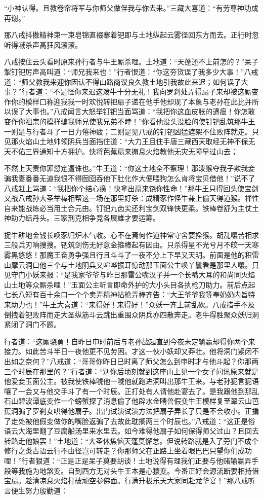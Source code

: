 \documentclass[12pt,UTF8]{ctexbook}
\begin{document}
“小神认得。且教卷帘将军与你师父做伴我与你去来。”三藏大喜道：“有劳尊神功成再谢。”

那八戒抖擞精神束一束皂锦直裰搴着钯即与土地纵起云雾径回东方而去。正行时忽听得喊杀声高狂风滚滚。

八戒按住云头看时原来孙行者与牛王厮杀哩。土地道：“天蓬还不上前怎的？”呆子掣钉钯厉声高叫道：“师兄我来也！”行者恨道：“你这夯货误了我多少大事！”八戒道：“师父教我来迎你因认不得山路商议良久教土地引我故此来迟；如何误了大事？”行者道：“不是怪你来迟这泼牛十分无礼！我向罗刹处弄得扇子来却被这厮变作你的模样口称迎我我一时欢悦转把扇子递在他手他却现了本象与老孙在此比并所以误了大事也。”八戒闻言大怒举钉钯当面骂道：“我把你这血皮胀的遭瘟！你怎敢变作你祖宗的模样骗我师兄使我兄弟不睦！”你看他没头没脸的使钉钯乱筑那牛王一则是与行者斗了一日力倦神疲；二则是见八戒的钉钯凶猛遮架不住败阵就走。只见那火焰山土地帅领阴兵当面挡住道：“大力王且住手唐三藏西天取经无神不保无天不佑三界通知十方拥护。快将芭蕉扇来搧息火焰教他无灾无障早过山去；

不然上天责你罪愆定遭诛也。”牛王道：“你这土地全不察理！那泼猴夺我子欺我妾骗我妻番番无道我恨不得囫囵吞他下肚化作大便喂狗怎么肯将宝贝借他！”说不了八戒赶上骂道：“我把你个结心癀！快拿出扇来饶你性命！”那牛王只得回头使宝剑又战八戒孙大圣举棒相帮这一场在那里好杀：成精豕作怪牛兼上偷天得道猴。禅性自来能战炼必当用土合元由。钉钯九齿尖还利宝剑双锋快更柔。铁棒卷舒为主仗土神助力结丹头。三家刑克相争竞各展雄才要运筹。

捉牛耕地金钱长唤豕归炉木气收。心不在焉何作道神常守舍要拴猴。胡乱嚷苦相求三般兵刃响搜搜。钯筑剑伤无好意金箍棒起有因由。只杀得星不光兮月不皎一天寒雾黑悠悠！那魔王奋勇争强且行且斗斗了一夜不分上下早又天明。前面是他的积雷山摩云洞口他三个与土地阴兵又喧哗振耳惊动那玉面公主唤丫鬟看是那里人嚷。只见守门小妖来报：“是我家爷爷与昨日那雷公嘴汉子并一个长嘴大耳的和尚同火焰山土地等众厮杀哩！”玉面公主听言即命外护的大小头目各执枪刀助力。前后点起七长八短有百十余口一个个卖弄精神拈枪弄棒齐告：“大王爷爷我等奉奶奶内旨特来助力也！”牛王大喜道：“来得好！来得好！”众妖一齐上前乱砍。八戒措手不及倒拽着钯败阵而走大圣纵筋斗云跳出重围众阴兵亦四散奔走。老牛得胜聚众妖归洞紧闭了洞门不题。

行者道：“这厮骁勇！自昨日申时前后与老孙战起直到今夜未定输赢却得你两个来接力。如此苦斗半日一夜他更不见劳困。才这一伙小妖却又莽壮。他将洞门紧闭不出如之奈何？”八戒道：“哥哥你昨日巳时离了师父怎么到申时才与他斗起？你那两三个时辰在那里的？”行者道：“别你后顷刻就到这座山上见一个女子问讯原来就是他爱妾玉面公主。被我使铁棒唬他一唬他就跑进洞叫出那牛王来。与老孙狔言狔语嚷了一会又与他交手斗了有一个时辰。正打处有人请他赴宴去了。是我跟他到那乱石山碧波潭底变作一个螃蟹探了消息偷了他辟水金睛兽假变牛王模样复至翠云山芭蕉洞骗了罗刹女哄得他扇子。出门试演试演方法把扇子弄长了只是不会收小。正掮了走处被他假变做你的嘴脸返骗了去故此耽搁两三个时辰也。”八戒道：“这正是俗语云大海里翻了豆腐船汤里来水里去。如今难得他扇子如何保得师父过山？且回去转路走他娘罢！”土地道：“大圣休焦恼天蓬莫懈怠。但说转路就是入了旁门不成个修行之类古语云行不由径岂可转走？你那师父在正路上坐着眼巴巴只望你们成功哩！”行者狠道：“正是正是呆子莫要胡谈！土地说得有理我们正要与他赌输赢弄手段等我施为地煞变。自到西方无对头牛王本是心猿变。今番正好会源流断要相持借宝扇。趁清凉息火焰打破顽空参佛面。行满升极乐天大家同赴龙华宴！”那八戒听言便生努力殷勤道：
\end{document}
